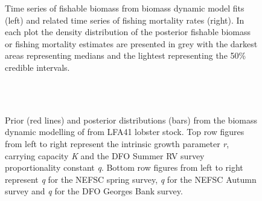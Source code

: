 \documentclass[11pt]{article}
\newcommand{\D}{.}
\newcommand{\spm}{/backup/bio_data/bio.lobster/spmodelling/lfa41/}
\begin{document}
\begin{landscape}
\begin{figure}
\centering
       \caption{Time series of fishable biomass from  biomass dynamic model fits (left) and related time series of fishing mortality rates (right). In each plot the density distribution of the posterior fishable biomass or fishing mortality estimates are presented in grey with the darkest areas representing medians and the lightest representing the 50\% credible intervals.}

\end{figure}
     \clearpage




\begin{figure}
\centering
        \\
        \\
        \caption{Prior (red lines) and posterior distributions (bars) from the biomass dynamic modelling of from LFA41 lobster stock. Top row figures from left to right represent the intrinsic growth parameter \emph{r}, carrying capacity \emph{K} and the DFO Summer RV survey proportionality constant \emph{q}. Bottom row figures from left to right represent \emph{q} for the NEFSC spring survey, \emph{q} for the NEFSC Autumn survey and \emph{q} for the DFO Georges Bank survey. }
        
\end{figure}
     \clearpage



\end{landscape}
\end{document}
